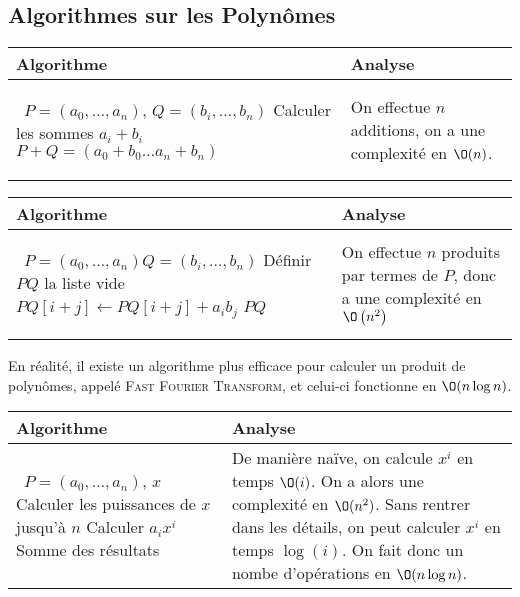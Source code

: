 \documentclass{cours}
\begin{document}
\subsection{Algorithmes sur les Polynômes}
\begin{tabular}{m{.5\linewidth}m{.45\linewidth}}
    Algorithme                                                                                   & Analyse \\
    \midrule{
    \begin{algorithmic}
            \Input\  $P = \left(a_{0}, \ldots, a_{n}\right)$, \newline $Q = \left(b_{i}, \ldots, b_{n}\right)$
            \EndInput
            \State Calculer les sommes $a_{i} + b_{i}$
            \State \Return $P + Q = \left(a_{0} + b_{0} \ldots a_{n} + b_{n}\right)$
        \end{algorithmic}} &
    On effectue $n$ additions, on a une complexité en $\O(n)$.                                             \\
\end{tabular}
\begin{tabular}{m{.5\linewidth}m{.45\linewidth}}
    Algorithme                                                                                                         & Analyse \\
    \midrule
    \begin{algorithmic}
        \Input\  $P = \left(a_{0}, \ldots, a_{n}\right)$\newline $Q = \left(b_{i}, \ldots, b_{n}\right)$
        \EndInput
        \State Définir $PQ$ la liste vide
        \For {$i = 0$ à $n$}
        \For {$j = 0$ à $n$}
        \State $PQ[i + j] \gets PQ[i + j] + a_{i}b_{j}$
        \EndFor
        \EndFor
        \State \Return $PQ$
    \end{algorithmic} & On effectue $n$ produits par termes de $P$, donc a une complexité en $\O\left(n^{2}\right)$
\end{tabular}
En réalité, il existe un algorithme plus efficace pour calculer un produit de polynômes, appelé \textsc{Fast Fourier Transform}, et celui-ci fonctionne en $\O(n\log{n})$.

\begin{tabular}{m{.5\linewidth}m{.45\linewidth}}
    Algorithme                                            & Analyse \\
    \midrule{
    \begin{algorithmic}
            \Input\  $P = \left(a_{0}, \ldots, a_{n}\right)$, $x$
            \EndInput
            \State Calculer les puissances de $x$ jusqu'à $n$
            \State Calculer $a_{i}x^{i}$
            \State \Return Somme des résultats
        \end{algorithmic}} &
    De manière naïve, on calcule $x^{i}$ en temps $\O(i)$. On a alors une complexité en $\O(n^{2})$.\newline
    Sans rentrer dans les détails, on peut calculer $x^{i}$ en temps $\log(i)$. On fait donc un nombe d'opérations en $\O(n\log n)$.
\end{tabular}
\end{document}
